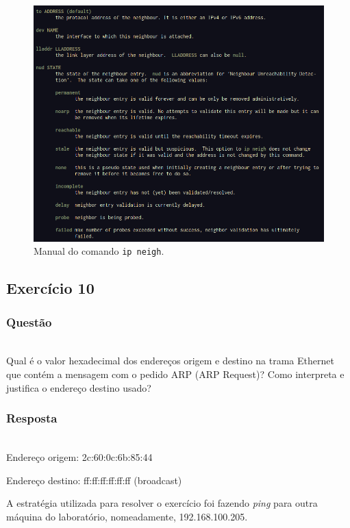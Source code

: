 \documentclass{llncs}
\begin{document}
\begin{figure}
  \begin{center}
	  \includegraphics[scale=0.5]{./imagens/ip_neigh.png} 
  \end{center}
	\caption{Manual do comando \texttt{ip neigh}.}
  \label{fig:ip_neigh}
\end{figure} 


\clearpage
\subsection{Exercício 10}
\subsubsection{Questão}\rule[-10pt]{0pt}{10pt}\\

Qual é o valor hexadecimal dos endereços origem e destino na trama Ethernet que contém a mensagem com o pedido ARP (ARP Request)? Como interpreta e justifica o endereço destino usado?

\subsubsection{Resposta}\rule[-10pt]{0pt}{10pt}\\

Endereço origem: 2c:60:0c:6b:85:44

Endereço destino: ff:ff:ff:ff:ff:ff (broadcast)

A estratégia utilizada para resolver o exercício foi fazendo \textit{ping} para outra máquina do laboratório, nomeadamente, 192.168.100.205.
\end{document}
